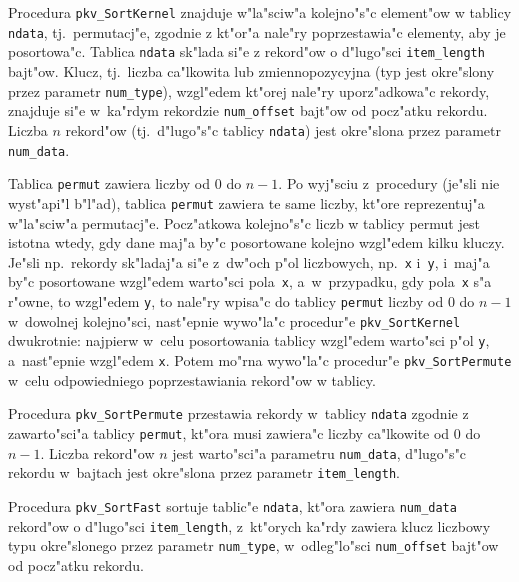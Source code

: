 \vspace{\bigskipamount}
Procedura \texttt{pkv\_SortKernel} znajduje w"la"sciw"a kolejno"s"c
element"ow w tablicy \texttt{ndata}, tj.\ permutacj"e, zgodnie z kt"or"a
nale"ry poprzestawia"c elementy, aby je posortowa"c. Tablica \texttt{ndata}
sk"lada si"e z rekord"ow o d"lugo"sci \texttt{item\_length} bajt"ow. Klucz,
tj.\ liczba ca"lkowita lub zmiennopozycyjna (typ jest okre"slony przez
parametr \texttt{num\_type}), wzgl"edem kt"orej nale"ry uporz"adkowa"c
rekordy, znajduje si"e w~ka"rdym rekordzie \texttt{num\_offset} bajt"ow od
pocz"atku rekordu. Liczba $n$ rekord"ow (tj.\ d"lugo"s"c tablicy
\texttt{ndata}) jest okre"slona przez parametr \texttt{num\_data}.

Tablica \texttt{permut} zawiera liczby od $0$ do $n-1$. Po wyj"sciu
z~procedury (je"sli nie wyst"api"l b"l"ad), tablica \texttt{permut} zawiera
te same liczby, kt"ore reprezentuj"a w"la"sciw"a permutacj"e.
Pocz"atkowa kolejno"s"c liczb w tablicy permut jest
istotna wtedy, gdy dane maj"a by"c posortowane kolejno wzgl"edem kilku kluczy.
Je"sli np.\ rekordy sk"ladaj"a si"e z~dw"och p"ol liczbowych, np.\ \texttt{x}
i~\texttt{y}, i~maj"a by"c posortowane wzgl"edem warto"sci pola~\texttt{x},
a~w~przypadku, gdy pola~\texttt{x} s"a r"owne, to wzgl"edem \texttt{y}, to
nale"ry wpisa"c do tablicy \texttt{permut} liczby od $0$ do $n-1$ w~dowolnej
kolejno"sci, nast"epnie wywo"la"c procedur"e \texttt{pkv\_SortKernel}
dwukrotnie: najpierw w~celu posortowania tablicy wzgl"edem warto"sci p"ol
\texttt{y}, a~nast"epnie wzgl"edem \texttt{x}. Potem mo"rna wywo"la"c
procedur"e \texttt{pkv\_SortPermute} w~celu odpowiedniego poprzestawiania
rekord"ow w tablicy.

\vspace{\bigskipamount}
Procedura \texttt{pkv\_SortPermute} przestawia rekordy w~tablicy
\texttt{ndata} zgodnie z zawarto"sci"a tablicy \texttt{permut}, kt"ora musi
zawiera"c liczby ca"lkowite od $0$ do $n-1$. Liczba rekord"ow $n$ jest
warto"sci"a parametru \texttt{num\_data}, d"lugo"s"c rekordu w~bajtach jest
okre"slona przez parametr \texttt{item\_length}.

\vspace{\bigskipamount}
Procedura \texttt{pkv\_SortFast} sortuje tablic"e \texttt{ndata}, kt"ora
zawiera \texttt{num\_data} rekord"ow o d"lugo"sci \texttt{item\_length},
z~kt"orych ka"rdy zawiera klucz liczbowy typu okre"slonego przez parametr
\texttt{num\_type}, w~odleg"lo"sci \texttt{num\_offset} bajt"ow od pocz"atku
rekordu.


